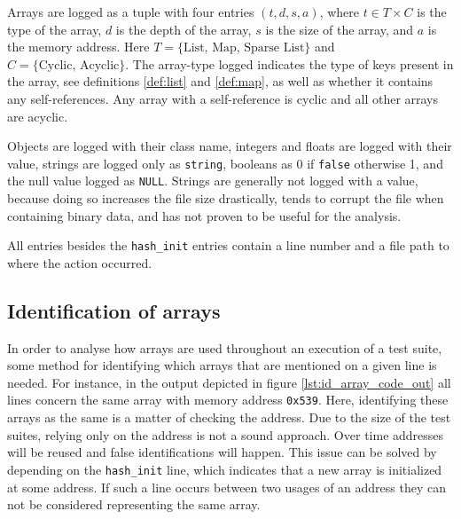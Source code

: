 Arrays are logged as a tuple with four entries $(t,d,s,a)$, where $t\in T\times C$ is the type of the array, $d$ is the depth of the array, $s$ is the size of the array, and $a$ is the memory address. Here $T = \{\text{List, Map, Sparse List}\}$ and $C = \{\text{Cyclic, Acyclic}\}$. The array-type logged indicates the type of keys present in the array, see definitions \ref{def:list} and \ref{def:map}, as well as whether it contains any self-references. Any array with a self-reference is cyclic and all other arrays are acyclic.

Objects are logged with their class name, integers and floats are logged with their value, strings are logged only as \texttt{string}, booleans as $0$ if \texttt{false} otherwise 1, and the null value logged as \texttt{NULL}. Strings are generally not logged with a value, because doing so increases the file size drastically, tends to corrupt the file when containing binary data, and has not proven to be useful for the analysis.

All entries besides the \texttt{hash\_init} entries contain a line number and a file path to where the action occurred. 

\subsection{Identification of arrays}
In order to analyse how arrays are used throughout an execution of a test suite, some method for identifying which arrays that are mentioned on a given line is needed. For instance, in the output depicted in figure \ref{lst:id_array_code_out} all lines concern the same array with memory address \texttt{0x539}. Here, identifying these arrays as the same is a matter of checking the address. Due to the size of the test suites, relying only on the address is not a sound approach. Over time addresses will be reused and false identifications will happen. This issue can be solved by depending on the \texttt{hash\_init} line, which indicates that a new array is initialized at some address. If such a line occurs between two usages of an address they can not be considered representing the same array. 


